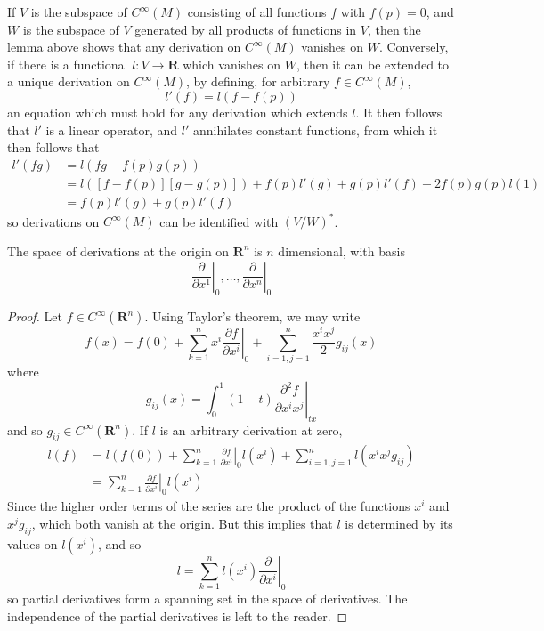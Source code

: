 If $V$ is the subspace of $C^\infty(M)$ consisting of all functions $f$ with $f(p) = 0$, and $W$ is the subspace of $V$ generated by all products of functions in $V$, then the lemma above shows that any derivation on $C^\infty(M)$ vanishes on $W$. Conversely, if there is a functional $l: V \to \mathbf{R}$ which vanishes on $W$, then it can be extended to a unique derivation on $C^\infty(M)$, by defining, for arbitrary $f \in C^\infty(M)$,
%
\[ l'(f) = l(f - f(p)) \]
%
an equation which must hold for any derivation which extends $l$. It then follows that $l'$ is a linear operator, and $l'$ annihilates constant functions, from which it then follows that
%
\begin{align*}
    l'(fg) &= l(fg - f(p)g(p))\\
    &= l([f - f(p)][g - g(p)]) + f(p) l'(g) + g(p) l'(f) - 2 f(p) g(p) l(1)\\
    &= f(p) l'(g) + g(p) l'(f)
\end{align*}
%
so derivations on $C^\infty(M)$ can be identified with $(V/W)^*$.

\begin{theorem}
    The space of derivations at the origin on $\mathbf{R}^n$ is $n$ dimensional, with basis
    \[ \left.\frac{\partial}{\partial x^1}\right|_0, \dots, \left.\frac{\partial}{\partial x^n}\right|_0 \]
\end{theorem}
\begin{proof}
    Let $f \in C^\infty(\mathbf{R}^n)$. Using Taylor's theorem, we may write
    \[ f(x) = f(0) + \sum_{k = 1}^n x^i \left.\frac{\partial f}{\partial x^i}\right|_0 + \sum_{i = 1,j = 1}^n \frac{x^i x^j}{2} g_{ij}(x) \]
    where
    \[ g_{ij}(x) = \int_0^1 (1 - t) \left. \frac{\partial^2 f}{\partial x^i x^j} \right|_{tx} \]
    and so $g_{ij} \in C^\infty(\mathbf{R}^n)$. If $l$ is an arbitrary derivation at zero,
    \begin{align*}
        l(f) &= l(f(0)) + \sum_{k = 1}^n \left.\frac{\partial f}{\partial x^i}\right|_0 l(x^i) + \sum_{i = 1, j =1}^n l(x^i x^j g_{ij})\\
        &= \sum_{k = 1}^n \left.\frac{\partial f}{\partial x^i}\right|_0 l(x^i)
    \end{align*}
    Since the higher order terms of the series are the product of the functions $x^i$ and $x^j g_{ij}$, which both vanish at the origin. But this implies that $l$ is determined by its values on $l(x^i)$, and so
    \[ l = \sum_{k = 1}^n l(x^i) \left.\frac{\partial}{\partial x^i}\right|_0 \]
    so partial derivatives form a spanning set in the space of derivatives. The independence of the partial derivatives is left to the reader.
\end{proof}

